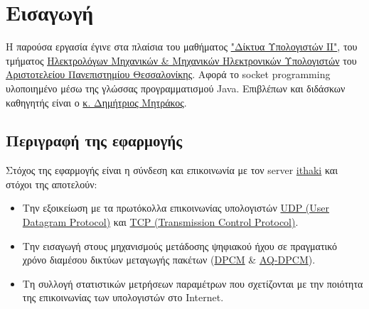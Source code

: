 \chapter{Εισαγωγή}
Η παρούσα εργασία έγινε στα πλαίσια του μαθήματος
\href{http://qa.auth.gr/el/class/1/600010175}{"Δίκτυα Υπολογιστών ΙΙ"},
του τμήματος \href{http://ee.auth.gr/}{Ηλεκτρολόγων Μηχανικών \& Μηχανικών Ηλεκτρονικών Υπολογιστών}
του \href{https://www.auth.gr/}{Αριστοτελείου Πανεπιστημίου Θεσσαλονίκης}.
Αφορά το socket programming υλοποιημένο μέσω της γλώσσας προγραμματισμού Java.
Επιβλέπων και διδάσκων καθηγητής είναι ο
\href{http://ithaki.eng.auth.gr/activities/cv-gr.html}{κ. Δημήτριος Μητράκος}.

\section{Περιγραφή της εφαρμογής}
Στόχος της εφαρμογής είναι η σύνδεση και επικοινωνία με τον server
\href{http://ithaki.eng.auth.gr/netlab/index.html}{ithaki}
και στόχοι της αποτελούν:
\begin{itemize}
\item Την εξοικείωση με τα πρωτόκολλα επικοινωνίας υπολογιστών \href{https://en.wikipedia.org/wiki/User_Datagram_Protocol}{UDP (User Datagram Protocol)} και
\href{https://en.wikipedia.org/wiki/Transmission_Control_Protocol}{TCP (Transmission Control Protocol)}.
\item Την εισαγωγή στους μηχανισμούς μετάδοσης ψηφιακού ήχου σε πραγματικό χρόνο διαμέσου δικτύων μεταγωγής πακέτων
(\href{https://en.wikipedia.org/wiki/Differential_pulse-code_modulation}{DPCM} \&
\href{https://en.wikipedia.org/wiki/Adaptive_differential_pulse-code_modulation}{AQ-DPCM}).
\item Τη συλλογή στατιστικών μετρήσεων παραμέτρων που σχετίζονται με την ποιότητα της επικοινωνίας των υπολογιστών στο Internet.
\end{itemize}
